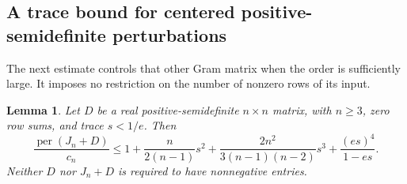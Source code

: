 \documentclass[11pt,a4paper]{article}
\newtheorem{lemma}[theorem]{Lemma}
\theoremstyle{definition}
\theoremstyle{remark}
\newcommand{\per}{\operatorname{per}}
\begin{document}
\subsection{A trace bound for centered positive-semidefinite perturbations}

The next estimate controls that other Gram matrix when the order is sufficiently large.
It imposes no restriction on the number of nonzero rows of its input.

\begin{lemma}\label{lem:struct-psd-trace}
Let $D$ be a real positive-semidefinite $n\times n$ matrix, with $n\ge3$, zero row sums, and trace $s<1/e$.
Then
\begin{equation}\label{eq:struct-psd-trace}
 \frac{\per(J_n+D)}{c_n}
 \le1+\frac{n}{2(n-1)}s^2
 +\frac{2n^2}{3(n-1)(n-2)}s^3
 +\frac{(es)^4}{1-es}.
\end{equation}
Neither $D$ nor $J_n+D$ is required to have nonnegative entries.
\end{lemma}
\end{document}
